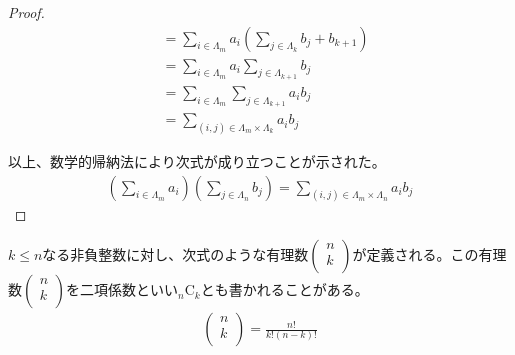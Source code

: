 \documentclass[dvipdfmx]{jsarticle}
\begin{document}
\begin{proof}
\begin{align*}
&= \sum_{i \in \varLambda_{m}} {a_{i}\left( \sum_{j \in \varLambda_{k}} b_{j} + b_{k + 1} \right)}\\
&= \sum_{i \in \varLambda_{m}} {a_{i}\sum_{j \in \varLambda_{k + 1}} b_{j}}\\
&= \sum_{i \in \varLambda_{m}} {\sum_{j \in \varLambda_{k + 1}} {a_{i}b_{j}}}\\
&= \sum_{(i,j) \in \varLambda_{m} \times \varLambda_{k}} {a_{i}b_{j}}
\end{align*}\par
以上、数学的帰納法により次式が成り立つことが示された。
\begin{align*}
\left( \sum_{i \in \varLambda_{m}} a_{i} \right)\left( \sum_{j \in \varLambda_{n}} b_{j} \right) = \sum_{(i,j) \in \varLambda_{m} \times \varLambda_{n}} {a_{i}b_{j}}
\end{align*}
\end{proof}
\begin{dfn}
$k \leq n$なる非負整数に対し、次式のような有理数$\begin{pmatrix}
n \\
k \\
\end{pmatrix}$が定義される。この有理数$\begin{pmatrix}
n \\
k \\
\end{pmatrix}$を二項係数といい${}_{n}\mathrm{C}_{k}$とも書かれることがある。
\begin{align*}
\begin{pmatrix}
n \\
k \\
\end{pmatrix} = \frac{n!}{k!(n - k)!}
\end{align*}
\end{dfn}
\end{document}
